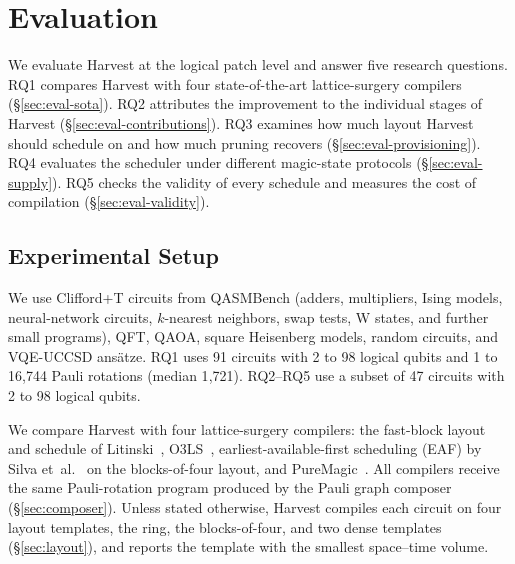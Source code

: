 \section{Evaluation}
\label{sec:evaluation}

We evaluate Harvest at the logical patch level and answer five research questions.
RQ1 compares Harvest with four state-of-the-art lattice-surgery compilers (\S\ref{sec:eval-sota}).
RQ2 attributes the improvement to the individual stages of Harvest (\S\ref{sec:eval-contributions}).
RQ3 examines how much layout Harvest should schedule on and how much pruning recovers (\S\ref{sec:eval-provisioning}).
RQ4 evaluates the scheduler under different magic-state protocols (\S\ref{sec:eval-supply}).
RQ5 checks the validity of every schedule and measures the cost of compilation (\S\ref{sec:eval-validity}).

\subsection{Experimental Setup}
\label{sec:eval-setup}

We use Clifford+T circuits from QASMBench (adders, multipliers, Ising models, neural-network circuits, $k$-nearest neighbors, swap tests, W states, and further small programs), QFT, QAOA, square Heisenberg models, random circuits, and VQE-UCCSD ansätze.
RQ1 uses  91 circuits with 2 to 98 logical qubits and 1 to 16{,}744 Pauli rotations (median 1{,}721).
RQ2--RQ5 use a subset of 47 circuits with 2 to 98 logical qubits.

We compare Harvest with four lattice-surgery compilers:
the fast-block layout and schedule of Litinski~\cite{litinski2019game},
O3LS~\cite{zhu2026o3ls},
earliest-available-first scheduling (EAF) by Silva et~al.~\cite{silva2024multi} on the blocks-of-four layout,
and PureMagic~\cite{hofmeyr2026scheduling}.
All compilers receive the same Pauli-rotation program produced by the Pauli graph composer (\S\ref{sec:composer}).
Unless stated otherwise, Harvest compiles each circuit on four layout templates, the ring, the blocks-of-four, and two dense templates (\S\ref{sec:layout}), and reports the template with the smallest space--time volume.

